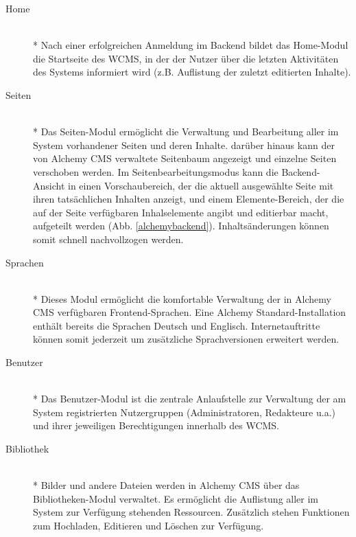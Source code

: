 \begin{description}
\item[Home]\mbox{~}\\*
Nach einer erfolgreichen Anmeldung im Backend bildet das Home-Modul die Startseite des WCMS, in der der Nutzer über die letzten Aktivitäten des Systems informiert wird (z.B. Auflistung der zuletzt editierten Inhalte).
\item[Seiten]\mbox{~}\\*
Das Seiten-Modul ermöglicht die Verwaltung und Bearbeitung aller im System vorhandener Seiten und deren Inhalte. darüber hinaus kann der von Alchemy CMS verwaltete Seitenbaum angezeigt und einzelne Seiten verschoben werden. Im Seitenbearbeitungsmodus kann die Backend-Ansicht in einen Vorschaubereich, der die aktuell ausgewählte Seite mit ihren tatsächlichen Inhalten anzeigt, und einem Elemente-Bereich, der die auf der Seite verfügbaren Inhalselemente angibt und editierbar macht, aufgeteilt werden (Abb. \ref{alchemybackend}). Inhaltsänderungen können somit schnell nachvollzogen werden.
\item[Sprachen]\mbox{~}\\*
Dieses Modul ermöglicht die komfortable Verwaltung der in Alchemy CMS verfügbaren Frontend-Sprachen. Eine Alchemy Standard-Installation enthält bereits die Sprachen Deutsch und Englisch. Internetauftritte können somit jederzeit um zusätzliche Sprachversionen erweitert werden.
\item[Benutzer]\mbox{~}\\*
Das Benutzer-Modul ist die zentrale Anlaufstelle zur Verwaltung der am System registrierten Nutzergruppen (Administratoren, Redakteure u.a.) und ihrer jeweiligen Berechtigungen innerhalb des WCMS.
\item[Bibliothek]\mbox{~}\\*
Bilder und andere Dateien werden in Alchemy CMS über das Bibliotheken-Modul verwaltet. Es ermöglicht die Auflistung aller im System zur Verfügung stehenden Ressourcen. Zusätzlich stehen Funktionen zum Hochladen, Editieren und Löschen zur Verfügung.
\end{description}
